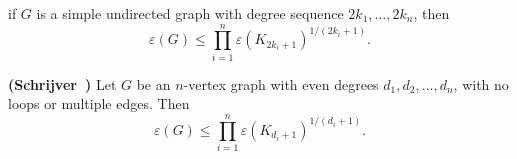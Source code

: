 if $G$ is a simple undirected graph with
degree sequence $2k_1,\ldots,2k_n$, then
\[
  \varepsilon(G)\leq
  \prod_{i=1}^n \varepsilon(K_{2k_i+1})^{1/(2k_i+1)}.
  \tag{22}
\]

\begin{conjecture} {\bf (Schrijver~\cite{Sch83})} \label{conj:schrijver-degrees}
Let $G$ be an $n$-vertex graph with even degrees $d_1,d_2,\dots,d_n$, with no loops or multiple edges. Then
\[
\varepsilon(G)\le \prod_{i=1}^n \varepsilon(K_{d_i+1})^{1/(d_i+1)}.
\]
\end{conjecture}

